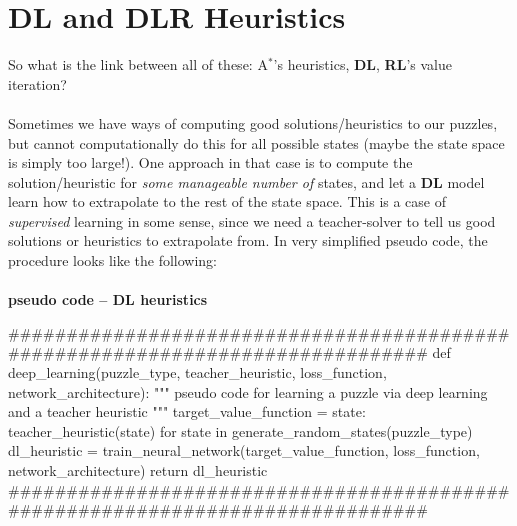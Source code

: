 
\section{DL and DLR Heuristics}

So what is the link between all of these: A$^{*}$'s heuristics, \textbf{DL}, \textbf{RL}'s value iteration?
\\
\\
Sometimes we have ways of computing good solutions/heuristics to our puzzles, but cannot computationally do this for all possible states (maybe the state space is simply too large!). One approach in that case is to compute the solution/heuristic for \textit{some manageable number of} states, and let a \textbf{DL} model learn how to extrapolate to the rest of the state space. This is a case of \textit{supervised} learning in some sense, since we need a teacher-solver to tell us good solutions or heuristics to extrapolate from. In very simplified pseudo code, the procedure looks like the following:
\teal
\paragraph{}{\textbf{pseudo code -- \textbf{DL} heuristics}}
\begin{pseudocode}
###############################################################################
def deep_learning(puzzle_type,
                  teacher_heuristic,
                  loss_function,
                  network_architecture):
    """ pseudo code for learning a puzzle via deep learning and a teacher heuristic """
    target_value_function = {state: teacher_heuristic(state)
                             for state in generate_random_states(puzzle_type)}
    dl_heuristic = train_neural_network(target_value_function,
                                        loss_function,
                                        network_architecture)
    return dl_heuristic
###############################################################################
\end{pseudocode}
\black

